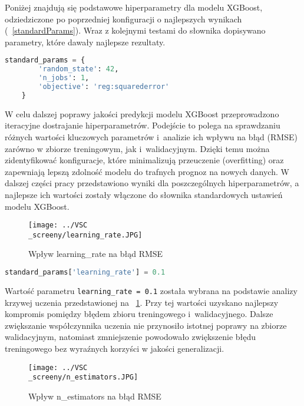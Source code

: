 \documentclass[12pt,a4paper]{report}
\theoremstyle{definition} %
\begin{document}
	Poniżej znajdują się podstawowe hiperparametry dla modelu XGBoost, odziedziczone po poprzedniej konfiguracji o najlepszych wynikach (\lstlistingname~\ref{standardParams}). Wraz z kolejnymi testami do słownika dopisywano parametry, które dawały najlepsze rezultaty.
	
	\begin{lstlisting}[language=Python,caption=Słownik standard\_params przed dostrajaniem hiperparametrów ,label=standardParams]
	standard_params = {
	    'random_state': 42,
	    'n_jobs': 1, 
	    'objective': 'reg:squarederror'
	}
	\end{lstlisting}

	W celu dalszej poprawy jakości predykcji modelu XGBoost przeprowadzono iteracyjne dostrajanie hiperparametrów. Podejście to polega na sprawdzaniu różnych wartości kluczowych parametrów i~analizie ich wpływu na błąd (RMSE) zarówno w zbiorze treningowym, jak i~walidacyjnym. Dzięki temu można zidentyfikować konfiguracje, które minimalizują 		przeuczenie (overfitting) oraz zapewniają lepszą zdolność modelu do trafnych prognoz na nowych danych. W dalszej części pracy przedstawiono wyniki dla poszczególnych hiperparametrów, a najlepsze ich wartości zostały włączone do słownika standardowych ustawień modelu XGBoost.

	\begin{figure}[H]
	    \centering
	    \texttt{[image: ../VSC\\\_screeny/learning\_rate.JPG]} 
	    \caption{Wpływ learning\_rate na błąd RMSE}
	    \label{fig:learningRate}
	\end{figure}
	
	\begin{lstlisting}[language=Python,caption=Dodawanie hiperparametru 'learning\_rate' do słownika standard\_params,label={KodPython3}]
	standard_params['learning_rate'] = 0.1
	\end{lstlisting}

	Wartość parametru \texttt{learning\_rate = 0.1} została wybrana na podstawie analizy krzywej uczenia przedstawionej na \figurename~\ref{fig:learningRate}. Przy tej wartości uzyskano najlepszy kompromis pomiędzy błędem zbioru treningowego i~walidacyjnego. Dalsze zwiększanie współczynnika uczenia nie przynosiło istotnej poprawy na zbiorze walidacyjnym, natomiast zmniejszenie powodowało zwiększenie błędu treningowego bez wyraźnych korzyści w jakości generalizacji.
	
	\begin{figure}[H]
	    \centering
	    \texttt{[image: ../VSC\\\_screeny/n\_estimators.JPG]} 
	    \caption{Wpływ n\_estimators na błąd RMSE}
	    \label{fig:nEstimators}
	\end{figure}
	
\end{document}
